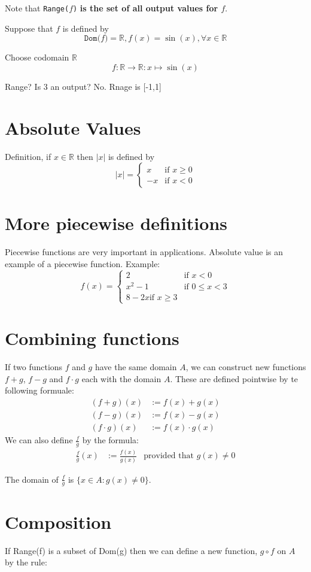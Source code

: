 Note that \texttt{Range($f$)} \textbf{is the set of all output values for $f$}.

Suppose that $f$ is defined by
$$\texttt{Dom($f$)} = \mathbb{R}, f(x) = \sin(x), \forall x \in \mathbb{R}$$

Choose codomain $\mathbb{R}$
$$f:\mathbb{R} \to \mathbb{R} : x \mapsto \sin(x)$$

Range? Is 3 an output? No.
Rnage is [-1,1]

\section{Absolute Values}
Definition, if $x \in \mathbb{R}$ then $|x|$ is defined by
$$|x| = \left\{
\begin{array}{ll}
     x & \mbox{if } x \geq 0 \\ 
    -x & \mbox{if } x < 0
\end{array}
\right.
$$
\section{More piecewise definitions}
Piecewise functions are very important in applications. Absolute value is an
example of a piecewise function.
Example:
$$
f(x) = \left\{
\begin{array}{ll}
  2 & \mbox{if } x < 0 \\
  x^2 - 1 & \mbox{if } 0 \leq x < 3 \\
  8 -2x \mbox{if } x \geq 3
\end{array}
\right.
$$

\section{Combining functions}
If two functions $f$ and $g$ have the same domain $A$, we can construct new
functions $f+g$, $f-g$ and $f\cdot g$ each with the domain $A$. These are
defined pointwise by te following formuale:
\begin{align}
  (f +g)(x) & := f(x) + g(x) \\
  (f -g)(x) & := f(x) - g(x) \\
  (f\cdot g)(x) & := f(x) \cdot g(x)
\end{align} 
We can also define $\frac{f}{g}$ by the formula:
\begin{align}
  \frac{f}{g}(x) & := \frac{f(x)}{g(x)} & \text{provided that $g(x) \neq 0$}
\end{align}

The domain of $\frac{f}{g}$ is $\{x \in A : g(x) \neq 0\}$.

\section{Composition}
If Range(f) is a subset of Dom(g) then we can define a new function, $g \circ f$
on $A$ by the rule:
